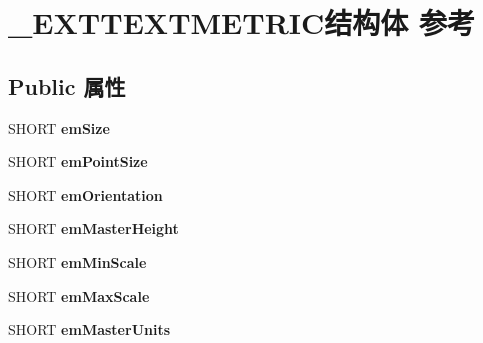 \hypertarget{struct___e_x_t_t_e_x_t_m_e_t_r_i_c}{}\section{\+\_\+\+E\+X\+T\+T\+E\+X\+T\+M\+E\+T\+R\+I\+C结构体 参考}
\label{struct___e_x_t_t_e_x_t_m_e_t_r_i_c}
\subsection*{Public 属性}
\begin{DoxyCompactItemize}
\item 
\mbox{\label{struct___e_x_t_t_e_x_t_m_e_t_r_i_c_a9315d24b3d71a785883b2f71067ee713}} 
S\+H\+O\+RT {\bfseries em\+Size}
\item 
\mbox{\label{struct___e_x_t_t_e_x_t_m_e_t_r_i_c_abad7e7715b07ce450adadc6d3cf3e8f4}} 
S\+H\+O\+RT {\bfseries em\+Point\+Size}
\item 
\mbox{\label{struct___e_x_t_t_e_x_t_m_e_t_r_i_c_afc997cb5e9c8cb6085a5c7b97fd56171}} 
S\+H\+O\+RT {\bfseries em\+Orientation}
\item 
\mbox{\label{struct___e_x_t_t_e_x_t_m_e_t_r_i_c_a1e1a79214856cac809f89dbd3acf9974}} 
S\+H\+O\+RT {\bfseries em\+Master\+Height}
\item 
\mbox{\label{struct___e_x_t_t_e_x_t_m_e_t_r_i_c_ae2c573241aa8f15a8d0db3edf5ce44eb}} 
S\+H\+O\+RT {\bfseries em\+Min\+Scale}
\item 
\mbox{\label{struct___e_x_t_t_e_x_t_m_e_t_r_i_c_a3d4c9db5eb70540407cfa28fb44554da}} 
S\+H\+O\+RT {\bfseries em\+Max\+Scale}
\item 
\mbox{\label{struct___e_x_t_t_e_x_t_m_e_t_r_i_c_ad87dd88112c92ce023b4a1c122cb562c}} 
S\+H\+O\+RT {\bfseries em\+Master\+Units}
\item 
\mbox{\label{struct___e_x_t_t_e_x_t_m_e_t_r_i_c_aa0215c56be9181a2ab94c92b51a67344}} 

\end{DoxyCompactItemize}
